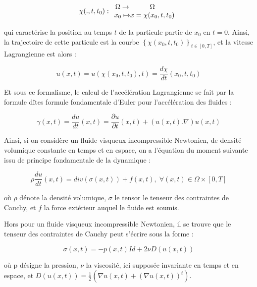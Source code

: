 \documentclass[a4paper,12pt]{article}
\begin{document}
\begin{equation}
\chi (.,t,t_0) : \begin{array}{c @{} c}
\Omega \to & \Omega \\
x_0 \mapsto & x = \chi (x_0,t,t_0) 
\end{array}
\end{equation}

qui caractérise la position au temps $t$ de la particule partie de $x_0$ en $t=0$. Ainsi, la trajectoire de cette particule est la courbe $\left \{ \chi (x_0,t,t_0) \right \}_{t \in [0,T]}$, et la vitesse Lagrangienne est alors :

\begin{equation}
u(x,t) = u (\chi (x_0,t,t_0),t) = \frac{d \chi}{d t} (x_0,t,t_0)
\end{equation}

Et sous ce formalisme, le calcul de l'accélération Lagrangienne se fait par la formule dîtes formule fondamentale d'Euler pour l'accélération des fluides :

\begin{equation}
\gamma (x,t) = \frac{d u}{d t} (x,t) = \frac{\partial u}{\partial t} (x,t) + \left( u (x,t) .\nabla \right) u(x,t)
\end{equation}

Ainsi, si on considère un fluide visqueux incompressible Newtonien, de densité volumique constante en temps et en espace, on a l'équation du moment suivante issu de principe fondamentale de la dynamique :

\begin{equation}
\rho \frac{du}{dt} (x,t) = div(\sigma (x,t)) + f(x,t), \; \forall (x,t) \in \Omega \times [0,T]
\end{equation}

où $\rho$ dénote la densité volumique, $\sigma$ le tensor le tenseur des contraintes de Cauchy, et $f$ la force extérieur auquel le fluide est soumis.

Hors pour un fluide visqueux incompressible Newtonien, il se trouve que le tenseur des contraintes de Cauchy peut s'écrire sous la forme :

\begin{equation}
\sigma (x,t) = -p(x,t) Id + 2\nu D(u(x,t))
\end{equation}

où p désigne la pression, $\nu$ la viscosité, ici supposée invariante en temps et en espace, et $D(u(x,t)) = \frac{1}{2} ( \nabla u (x,t) + (\nabla u (x,t))^t )$.
\end{document}
